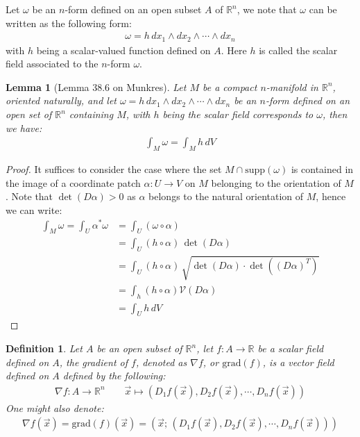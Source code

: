 \documentclass[11pt,oneside]{book}
\theoremstyle{break}
\theoremstyle{break}
\newtheorem{lem}{Lemma}[thm]
\newtheorem{defn}{Definition}[corL]
\newcommand{\R}{\mathbb{R}}
\newcommand{\supp}{\text{supp}}
\begin{document}
Let $\omega$ be an $n$-form defined on an open subset $A$ of $\R^n$, we note that $\omega$ can be written as the following form:
\begin{align*}
\omega = h\, dx_1\wedge dx_2 \wedge \cdots \wedge dx_n
\end{align*}
with $h$ being a scalar-valued function defined on $A$. Here $h$ is called the scalar field associated to the $n$-form $\omega$. 

\begin{lem}[Lemma 38.6 on Munkres]
Let $M$ be a compact $n$-manifold in $\R^n$, oriented naturally, and let $\omega = h\, dx_1 \wedge dx_2 \wedge \cdots \wedge dx_n$ be an $n$-form defined on an open set of $\R^n$ containing $M$, with $h$ being the scalar field corresponds to $\omega$, then we have:
\begin{align*}
\int_M \omega = \int_M h\, dV
\end{align*} 
\end{lem}
\begin{proof}
It suffices to consider the case where the set $M\cap \supp(\omega)$ is contained in the image of a coordinate patch $\alpha:U \to V$ on $M$ belonging to the orientation of $M$. Note that $\det(D\alpha)>0$ as $\alpha$ belongs to the natural orientation of $M$, hence we can write:
\begin{align*}
\int_M \omega = \int_U \alpha^*\omega &=\int_U (\omega \circ \alpha) \\
&= \int_{U}(h\circ \alpha) \, \det(D\alpha) \\
&=\int_{U}(h\circ \alpha) \, \sqrt{\det(D\alpha)\cdot \det((D\alpha)^T)} \\
&= \int_h (h\circ \alpha) \mathcal{V}(D\alpha) \\
&= \int_U h\, dV  
\end{align*}
\end{proof}

\begin{defn}
Let $A$ be an open subset of $\R^n$, let $f:A \to \R$ be a scalar field defined on $A$, the gradient of $f$, denoted as $\nabla f$, or $\text{grad}(f)$, is a vector field defined on $A$ defined by the following:
\begin{align*}
\nabla f: A \to \R^n \qquad \vec{x}\mapsto (D_1f(\vec{x}), D_2f(\vec{x}),\cdots , D_nf(\vec{x}))
\end{align*}
One might also denote:
\begin{align*}
\nabla f(\vec{x}) = \text{grad}(f)(\vec{x}) = (\vec{x};\, (D_1f(\vec{x}), D_2f(\vec{x}),\cdots , D_nf(\vec{x})))
\end{align*}
\end{defn}
\end{document}
